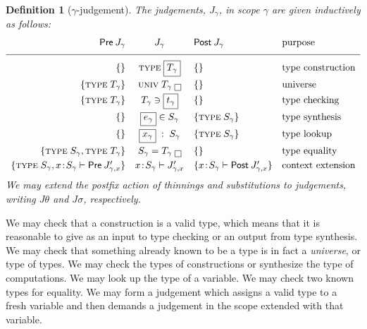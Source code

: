 \documentclass{jfp1}
\newtheorem{definition}[theorem]{Definition}
\newcommand{\Se}{\mathsf}
\begin{document}
\newcommand{\bx}[1]{\framebox{\ensuremath{#1}}}
\newcommand{\ty}[1]{\textsc{type}\;#1}
\newcommand{\univ}[1]{\textsc{univ}\;#1}
\newcommand{\chk}[2]{#1 \ni #2}
\newcommand{\syn}[2]{#1 \in #2}
\newcommand{\cxe}[2]{#1\!:\!#2\vdash}
\newcommand{\cxl}[2]{#1\;:\;#2}
\newcommand{\Pre}[1]{\Se{Pre}\:#1}
\newcommand{\Post}[1]{\Se{Post}\:#1}
\begin{definition}[$\gamma$-judgement\label{def:judgement}]
  The judgements, $J_\gamma$, in scope $\gamma$ are given inductively as follows:
  \[\begin{array}{r@{\quad}c@{\quad}l@{\quad}l}
      \Pre{J_\gamma} & J_\gamma& \Post{J_\gamma} & \mbox{purpose} \\
      \hline
      \{\} &\ty{\bx{T_\gamma}}& \{\}  & \mbox{type construction}
                                        \smallskip\\
      \{\ty{T_\gamma}\} &\univ{T_\gamma}\;\bx{}& \{\}  & \mbox{universe}
                                        \smallskip\\
      \{\ty{T_\gamma}\} & \chk{T_\gamma}{\bx{t_\gamma}} &\{\}  & \mbox{type checking}
                                                                 \smallskip\\
      \{\}  & \syn{\bx{e_\gamma}}{S_\gamma} & \{\ty{S_\gamma}\} & \mbox{type synthesis}
                                                                  \smallskip\\
      \{\}  & \cxl{\bx{x_\gamma}}{S_\gamma} & \{\ty{S_\gamma}\} & \mbox{type lookup}
                                                             \smallskip\\
      \{\ty{S_\gamma},\ty{T_\gamma}\} & S_\gamma = T_\gamma\;\bx{} & \{\}  & \mbox{type equality}
                                                                             \smallskip\\
      \{\ty{S_\gamma},\cxe x{S_\gamma} \Pre{J'_{\gamma,x}}\} & \cxe x{S_\gamma} J'_{\gamma,x}
           & \{\cxe x{S_\gamma}\Post{J'_{\gamma,x}}\} & \mbox{context extension} 
    \end{array}\]
  We may extend the postfix action of thinnings and substitutions to
  judgements, writing $J\theta$ and $J\sigma$, respectively.
\end{definition}

We may check that a construction is a valid type, which means that it
is reasonable to give as an input to type checking or an output from
type synthesis. We may check that something already known to be a type is in fact
a \emph{universe}, or type of types. We may check the types of constructions or synthesize
the type of computations. We may look up the type of a variable. We may check two known types
for equality. We may form a judgement which assigns a valid type to a fresh variable and
then demands a judgement in the scope extended with that variable.
\end{document}
